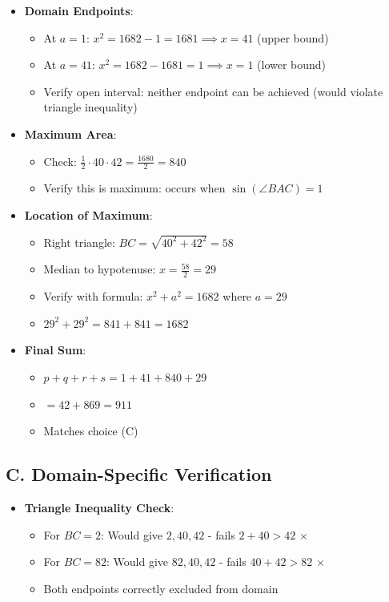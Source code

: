 \documentclass[12pt]{article}
\begin{document}
\begin{verificationbox}
\begin{itemize}[leftmargin=*]
    \item \textbf{Domain Endpoints}:
    \begin{itemize}
        \item At $a = 1$: $x^2 = 1682 - 1 = 1681 \implies x = 41$ (upper bound) \checkmark
        \item At $a = 41$: $x^2 = 1682 - 1681 = 1 \implies x = 1$ (lower bound) \checkmark
        \item Verify open interval: neither endpoint can be achieved (would violate triangle inequality) \checkmark
    \end{itemize}
    
    \item \textbf{Maximum Area}:
    \begin{itemize}
        \item Check: $\frac{1}{2} \cdot 40 \cdot 42 = \frac{1680}{2} = 840$ \checkmark
        \item Verify this is maximum: occurs when $\sin(\angle BAC) = 1$ \checkmark
    \end{itemize}
    
    \item \textbf{Location of Maximum}:
    \begin{itemize}
        \item Right triangle: $BC = \sqrt{40^2 + 42^2} = 58$ \checkmark
        \item Median to hypotenuse: $x = \frac{58}{2} = 29$ \checkmark
        \item Verify with formula: $x^2 + a^2 = 1682$ where $a = 29$
        \item $29^2 + 29^2 = 841 + 841 = 1682$ \checkmark
    \end{itemize}
    
    \item \textbf{Final Sum}:
    \begin{itemize}
        \item $p + q + r + s = 1 + 41 + 840 + 29$
        \item $= 42 + 869 = 911$ \checkmark
        \item Matches choice (C)
    \end{itemize}
\end{itemize}

\subsection*{C. Domain-Specific Verification}
\begin{itemize}[leftmargin=*]
    \item \textbf{Triangle Inequality Check}:
    \begin{itemize}
        \item For $BC = 2$: Would give $2, 40, 42$ - fails $2 + 40 > 42$ $\times$
        \item For $BC = 82$: Would give $82, 40, 42$ - fails $40 + 42 > 82$ $\times$
        \item Both endpoints correctly excluded from domain \checkmark
    \end{itemize}
    

\end{itemize}
\end{verificationbox}
\end{document}
